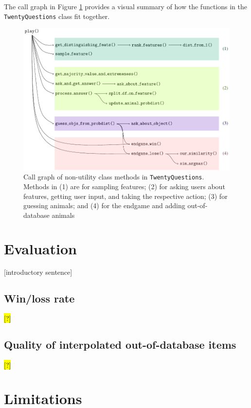 \documentclass[11pt,a4paper]{article}
\begin{document}
The call graph in Figure \ref{fig:call-graph} provides a visual summary of how the functions in the \texttt{TwentyQuestions} class fit together.

\begin{figure}
	\includegraphics[width=.9\linewidth]{graphics/call_graph.pdf}
	\caption{Call graph of non-utility class methods in \texttt{TwentyQuestions}. Methods in (1) are for sampling features; (2) for asking users about features, getting user input, and taking the respective action; (3) for guessing animals; and (4) for the endgame and adding out-of-database animals}
	\label{fig:call-graph}
\end{figure}

\section{Evaluation}
\label{sec:eval}

[introductory sentence]

\subsection{Win/loss rate}

\hl{[?]}

\subsection{Quality of interpolated out-of-database items}

\hl{[?]}

\section{Limitations}
\label{sec:limit}
\end{document}
